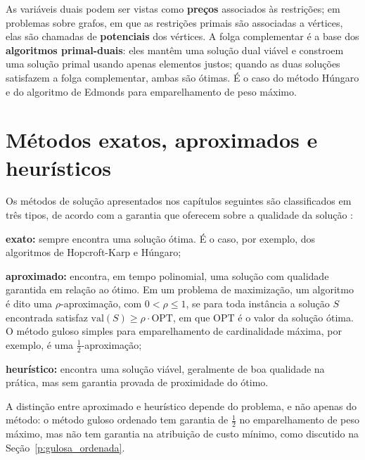 As variáveis duais podem ser vistas como \textbf{preços} associados às restrições; em problemas sobre grafos, em que as restrições primais são associadas a vértices, elas são chamadas de \textbf{potenciais} dos vértices. A folga complementar é a base dos \textbf{algoritmos primal-duais}: eles mantêm uma solução dual viável e constroem uma solução primal usando apenas elementos justos; quando as duas soluções satisfazem a folga complementar, ambas são ótimas. É o caso do método Húngaro e do algoritmo de Edmonds para emparelhamento de peso máximo.

\section{Métodos exatos, aproximados e heurísticos}
\label{sec:tipos_metodo}

Os métodos de solução apresentados nos capítulos seguintes são classificados em três tipos, de acordo com a garantia que oferecem sobre a qualidade da solução \cite{vazirani2001}:

\begin{alineas}
    \item \textbf{exato:} sempre encontra uma solução ótima. É o caso, por exemplo, dos algoritmos de Hopcroft-Karp e Húngaro;
    \item \textbf{aproximado:} encontra, em tempo polinomial, uma solução com qualidade garantida em relação ao ótimo. Em um problema de maximização, um algoritmo é dito uma $\rho$-aproximação, com $0 < \rho \le 1$, se para toda instância a solução $S$ encontrada satisfaz $\mathrm{val}(S) \ge \rho \cdot \mathrm{OPT}$, em que $\mathrm{OPT}$ é o valor da solução ótima. O método guloso simples para emparelhamento de cardinalidade máxima, por exemplo, é uma $\frac{1}{2}$-aproximação;
    \item \textbf{heurístico:} encontra uma solução viável, geralmente de boa qualidade na prática, mas sem garantia provada de proximidade do ótimo.
\end{alineas}

A distinção entre aproximado e heurístico depende do problema, e não apenas do método: o método guloso ordenado tem garantia de $\frac{1}{2}$ no emparelhamento de peso máximo, mas não tem garantia na atribuição de custo mínimo, como discutido na Seção~\ref{p:gulosa_ordenada}.

